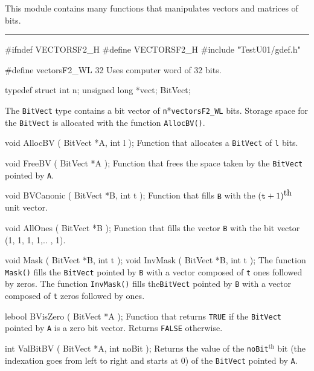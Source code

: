 This module contains many functions that manipulates vectors and
 matrices of bits.

\bigskip\hrule

\code\hide
#ifndef VECTORSF2_H
#define VECTORSF2_H
\endhide
#include "TestU01/gdef.h"
\endcode
\code

#define vectorsF2_WL      32
\endcode
 \tab
Uses computer word of 32 bits.
 \endtab
\bigskip




\code

typedef struct{        
   int n;
   unsigned long *vect;
} BitVect;
\endcode

 \tab
The {\tt BitVect} type contains a bit vector of
 {\tt n}*{\tt vectorsF2\_WL} bits.  Storage space for
the {\tt BitVect} is allocated with the function {\tt AllocBV()}.
 \endtab
\code


void AllocBV ( BitVect *A,
               int l 
             );
\endcode
 \tab
Function that allocates a {\tt BitVect} of {\tt l} bits.
 \endtab
\code


void FreeBV ( BitVect *A 
            );
\endcode
 \tab
Function that frees the space taken by the {\tt BitVect} pointed by {\tt A}.
 \endtab
\code


void BVCanonic ( BitVect *B, 
                 int t
               );
\endcode
 \tab
Function that fills {\tt B} with the $({\tt t}+1)^{\mbox{th}}$ unit vector.
 \endtab
\code


void AllOnes ( BitVect *B
             );
\endcode
 \tab
Function that fills the vector {\tt B} with the bit vector (1, 1, 1, 1,.. , 1).
 \endtab
\code


void Mask ( BitVect *B,
            int t
          );
void InvMask ( BitVect *B,
               int t
             );
\endcode
 \tab
The function {\tt Mask()} fills the {\tt BitVect} pointed by {\tt B} with a vector composed of {\tt t} ones followed by zeros.
The function {\tt InvMask()} fills the{\tt BitVect} pointed by {\tt B} with a vector composed of {\tt t} zeros followed by ones.
 \endtab
\code


lebool BVisZero ( BitVect *A
                );
\endcode
 \tab
Function that returns {\tt TRUE} if the {\tt BitVect} pointed by {\tt A} is a zero bit vector.  Returns {\tt FALSE} otherwise.
\endtab
\code


int ValBitBV ( BitVect *A, 
               int noBit
             );                     
\endcode
 \tab
Returns the value of the {\tt noBit}$^{\mbox{th}}$ bit (the indexation goes from left to right and starts at 0) of the
{\tt BitVect} pointed by {\tt A}.
 \endtab
\code


